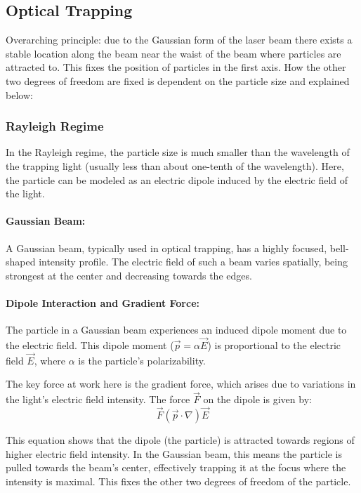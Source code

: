 \documentclass[12pt,english,ngerman]{scrartcl}
\begin{document}
\subsection{Optical Trapping}

Overarching principle: due to the Gaussian form of the laser beam there exists
a stable location along the beam near the waist of the beam where particles are
attracted to. This fixes the position of particles in the first axis. How the
other two degrees of freedom are fixed is dependent on the particle size and
explained below:

\subsubsection{Rayleigh Regime}

In the Rayleigh regime, the particle size is much smaller than the wavelength
of the trapping light (usually less than about one-tenth of the wavelength).
Here, the particle can be modeled as an electric dipole induced by the electric
field of the light.

\paragraph{Gaussian Beam:}
A Gaussian beam, typically used in optical trapping, has a highly focused,
bell-shaped intensity profile. The electric field of such a beam varies
spatially, being strongest at the center and decreasing towards the edges.

\paragraph{Dipole Interaction and Gradient Force:}
The particle in a Gaussian beam experiences an induced dipole moment due to the
electric field. This dipole moment ($\vec{p} = \alpha \vec{E}$) is proportional
to the electric field $\vec{E}$, where $\alpha$ is the particle's
polarizability.

The key force at work here is the gradient force, which arises due to
variations in the light's electric field intensity. The force $\vec{F}$ on the
dipole is given by:
\begin{equation}
	\vec{F} (\vec{p} \cdot \nabla) \vec{E}
\end{equation}

This equation shows that the dipole (the particle) is attracted towards regions
of higher electric field intensity. In the Gaussian beam, this means the
particle is pulled towards the beam's center, effectively trapping it at the
focus where the intensity is maximal. This fixes the other two degrees of
freedom of the particle.\cite{bustamanteOpticalTweezersSinglemolecule2021}
\end{document}
